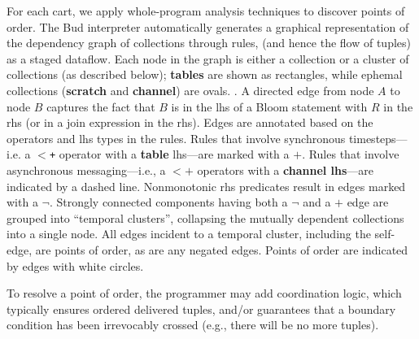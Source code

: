 For each cart, we apply whole-program analysis techniques to discover points of 
order.  The Bud interpreter automatically generates
a graphical representation of the dependency graph of collections through rules,
(and hence the 
flow of tuples) as a staged dataflow.  Each node in the graph is either
a collection or a cluster of collections (as described below); \textbf{tables} are shown
as rectangles, while ephemal collections (\textbf{scratch} and \textbf{channel}) are ovals.
.  A directed edge from node $A$ to node $B$ captures the fact that $B$ is in the lhs of a Bloom statement with $R$ in the rhs (or in a join expression in the rhs).  Edges are annotated based on the operators and lhs types in the rules.  Rules that involve synchronous timesteps---i.e. a \texttt{$<$+} operator with a {\bf table} lhs---are marked with a $+$.  Rules that involve asynchronous messaging---i.e., a \texttt{$<+$} operators with a {\bf channel lhs}---are indicated by a dashed line.  Nonmonotonic rhs predicates result in edges marked with a $\lnot$.  Strongly connected components having both a $\lnot$ and a $+$ edge are grouped into ``temporal clusters'', 
collapsing the mutually dependent collections into a single node.  All edges
incident to a temporal cluster, including the self-edge, are points of order,
as are any negated edges.
Points of order are indicated by edges with white circles.

To resolve a point of order, the programmer may add coordination logic, which typically ensures  ordered delivered tuples, and/or guarantees that a boundary condition has been irrevocably crossed (e.g., there will be no more tuples).


